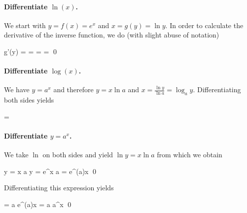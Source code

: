 
\paragraph{Differentiate $\ln(x)$.} We start with $y = f(x)=e^x$ and $x = g(y) = \ln y$. In order to calculate the derivative of the inverse function, we do (with slight abuse of notation)

\bee
g'(y) =  =  =  =  \qed
\eee

\paragraph{Differentiate $\log(x)$.} We have $y = a^x$ and therefore $y = x \ln a$ and $x = \frac{\ln y}{\ln a} = \log_a y$. Differentiating both sides yields

\bee
{} = 
\eee 


\paragraph{Differentiate $y = a^x$.} We take $\ln$ on both sides and yield $\ln y = x \ln a$ from which we obtain

\bee
\ln y = x \ln a \rightarrow y = e^{x \ln a} = e^{(\ln a)x} \qed
\eee

Differentiating this expression yields

\bee
{} = \ln a e^{(\ln a)x} = \ln a \cdot a^x \qed
\eee